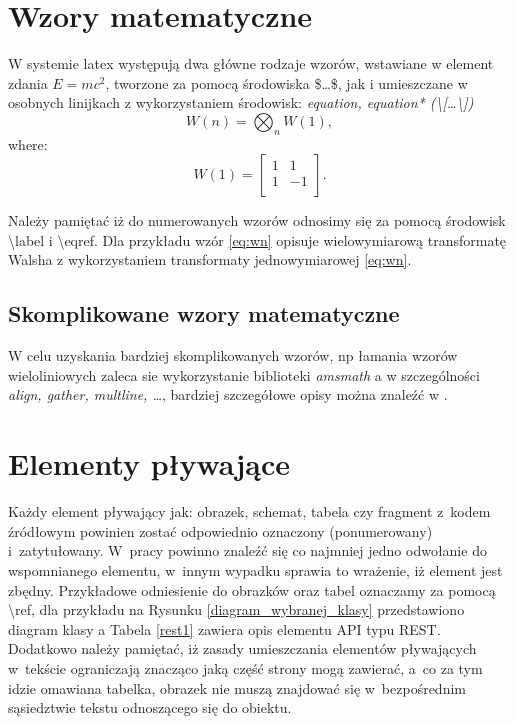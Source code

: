 \documentclass{wfiisul}
\begin{document}
\section{Wzory matematyczne}
W systemie latex występują dwa główne rodzaje wzorów, wstawiane w element zdania $E = mc^2$, tworzone za pomocą środowiska \$\dots\$, jak i umieszczane w osobnych linijkach z wykorzystaniem środowisk: \textit{equation, equation* (\textbackslash[\dots\textbackslash])}
\begin{equation}\label{eq:wn}
W(n) = \bigotimes_{n} W(1),
\end{equation}
where:
\begin{equation}\label{eq:w1}
W(1) = \begin{bmatrix}
         1 & 1 \\
         1 & -1 \\
       \end{bmatrix}.
\end{equation}

Należy pamiętać iż do numerowanych wzorów odnosimy się za pomocą środowisk {\textbackslash}label i {\textbackslash}eqref. Dla przykładu wzór \eqref{eq:wn} opisuje wielowymiarową transformatę Walsha z wykorzystaniem transformaty jednowymiarowej \eqref{eq:wn}.

\subsection{Skomplikowane wzory matematyczne}
W celu uzyskania bardziej skomplikowanych wzorów, np łamania wzorów wieloliniowych zaleca sie wykorzystanie biblioteki \textit{amsmath} a w szczególności \textit{align, gather, multline, \dots}, bardziej szczegółowe opisy można znaleźć w \cite{latex_math_wiki}.

\section{Elementy pływające}
Każdy element pływający jak: obrazek, schemat, tabela czy fragment z~kodem źródłowym powinien zostać odpowiednio oznaczony (ponumerowany) i~zatytułowany. W~pracy powinno znaleźć się co najmniej jedno odwołanie do wspomnianego elementu, w~innym wypadku sprawia to wrażenie, iż element jest zbędny. Przykładowe odniesienie do obrazków oraz tabel oznaczamy za pomocą {\textbackslash}ref, dla przykładu na Rysunku \ref{diagram_wybranej_klasy} przedstawiono diagram klasy a Tabela \ref{rest1} zawiera opis elementu API typu REST. Dodatkowo należy pamiętać, iż zasady umieszczania elementów pływających w~tekście ograniczają znacząco jaką część strony mogą zawierać, a~co za tym idzie omawiana tabelka, obrazek nie muszą znajdować się w~bezpośrednim sąsiedztwie tekstu odnoszącego się do obiektu.
\end{document}
